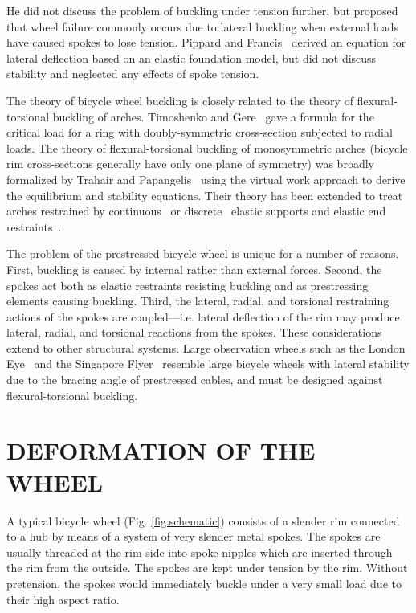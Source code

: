 \documentclass{bmd2016p}
\begin{document}
He did not discuss the problem of buckling under tension further, but proposed that wheel failure commonly occurs due to lateral buckling when external loads have caused spokes to lose tension. Pippard and Francis~\cite{Pippard1932d} derived an equation for lateral deflection based on an elastic foundation model, but did not discuss stability and neglected any effects of spoke tension.

The theory of bicycle wheel buckling is closely related to the theory of flexural-torsional buckling of arches. Timoshenko and Gere~\cite{Timoshenko1961a} gave a formula for the critical load for a ring with doubly-symmetric cross-section subjected to radial loads. The theory of flexural-torsional buckling of monosymmetric arches (bicycle rim cross-sections generally have only one plane of symmetry) was broadly formalized by Trahair and Papangelis~\cite{Trahair1987b} using the virtual work approach to derive the equilibrium and stability equations. Their theory has been extended to treat arches restrained by continuous~\cite{Pi2002b} or discrete~\cite{Bradford2002d} elastic supports and elastic end restraints~\cite{Guo2014b}.

The problem of the prestressed bicycle wheel is unique for a number of reasons. First, buckling is caused by internal rather than external forces. Second, the spokes act both as elastic restraints resisting buckling and as prestressing elements causing buckling. Third, the lateral, radial, and torsional restraining actions of the spokes are coupled---i.e. lateral deflection of the rim may produce lateral, radial, and torsional reactions from the spokes. These considerations extend to other structural systems. Large observation wheels such as the London Eye~\cite{Mann2001a} and the Singapore Flyer~\cite{Allsop2009a} resemble large bicycle wheels with lateral stability due to the bracing angle of prestressed cables, and must be designed against flexural-torsional buckling.



\section{DEFORMATION OF THE WHEEL}
A typical bicycle wheel (Fig. \ref{fig:schematic}) consists of a slender rim connected to a hub by means of a system of very slender metal spokes. The spokes are usually threaded at the rim side into spoke nipples which are inserted through the rim from the outside. The spokes are kept under tension by the rim. Without pretension, the spokes would immediately buckle under a very small load due to their high aspect ratio.
\end{document}

